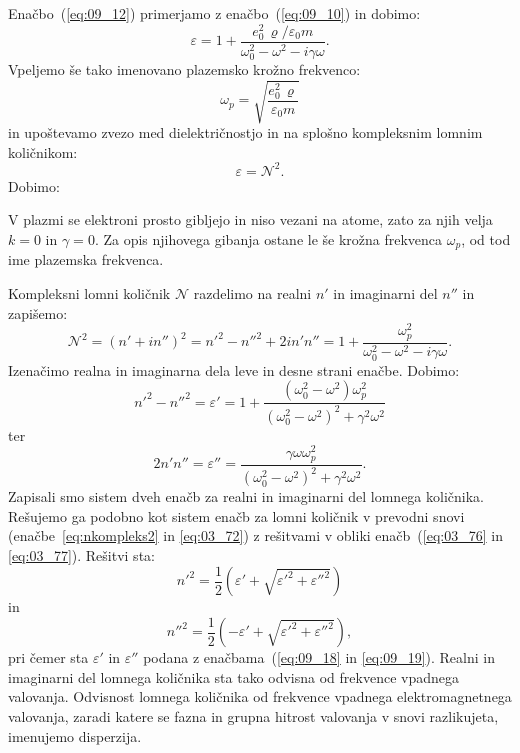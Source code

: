 Enačbo~(\ref{eq:09_12}) primerjamo z enačbo~(\ref{eq:09_10}) in dobimo:
\begin{equation}
\varepsilon= 1 + \frac{e_0^2\,\varrho/\varepsilon_0 m}{\omega_0^2 - \omega^2 - i\gamma \omega}.
\label{eq:09_13}
\end{equation}
Vpeljemo še tako imenovano plazemsko krožno frekvenco:
\begin{equation}
\omega_p = \sqrt{\frac{e_0^2\,\varrho }{\varepsilon_0 m}}
\label{eq:09_14}
\end{equation}
in upoštevamo zvezo med dielektričnostjo in na splošno kompleksnim lomnim 
količnikom:
\begin{equation}
\varepsilon = \mathcal{N}^2.
\label{eq:09_15}
\end{equation}
Dobimo:
\begin{remark}
V plazmi se elektroni prosto gibljejo in niso vezani na atome,
zato za njih velja $k=0$ in $\gamma = 0$. Za opis njihovega
gibanja ostane le še krožna frekvenca $\omega_p$, od tod ime plazemska frekvenca.
\end{remark}

Kompleksni lomni količnik $\mathcal{N}$ razdelimo na realni $n'$ in imaginarni del $n''$ in 
zapišemo:
\begin{equation}
\mathcal{N}^2 = (n'+in'')^2 = n'^2-n''^2+2in'n'' =  1+ \frac{\omega_p^2}{\omega_0^2 - \omega^2 - i\gamma \omega}.
\label{eq:09_17}
\end{equation}
Izenačimo realna in imaginarna dela leve in desne strani enačbe. Dobimo:
\begin{equation}
n'^2 -n''^2 = \varepsilon' = 1 + \frac{\left(\omega_0^2 - \omega^2\right)\omega_p^2}{\left(\omega_0^2 - 
\omega^2\right)^2 + \gamma^2 \omega^2}
\label{eq:09_18}
\end{equation}
ter 
\begin{equation}
2n'n'' = \varepsilon'' = \frac{\gamma \omega \omega_p^2}{\left(\omega_0^2 - 
\omega^2\right)^2 + \gamma^2 \omega^2}.
\label{eq:09_19}
\end{equation}
Zapisali smo sistem dveh enačb za realni in imaginarni del lomnega količnika. Rešujemo ga podobno kot
sistem enačb za lomni količnik v prevodni snovi (enačbe~\ref{eq:nkompleks2} in \ref{eq:03_72})
z rešitvami v obliki enačb~(\ref{eq:03_76} in \ref{eq:03_77}). Rešitvi sta:
\begin{equation}
n'^2 = \frac{1}{2}\left(\varepsilon'+\sqrt{\varepsilon'^2 + \varepsilon''^2}\right)
\label{eq:09_20}
\end{equation}
in
\begin{equation}
n''^2 = \frac{1}{2}\left(-\varepsilon'+\sqrt{\varepsilon'^2 + \varepsilon''^2}\right)\!,
\label{eq:09_21}
\end{equation}
pri čemer sta $\varepsilon'$ in $\varepsilon''$ podana z enačbama~(\ref{eq:09_18} in \ref{eq:09_19}).
Realni in imaginarni del lomnega količnika sta tako odvisna od frekvence vpadnega valovanja. 
Odvisnost lomnega količnika od frekvence vpadnega elektromagnetnega valovanja, zaradi katere
se fazna in grupna hitrost valovanja v snovi razlikujeta, imenujemo disperzija.

